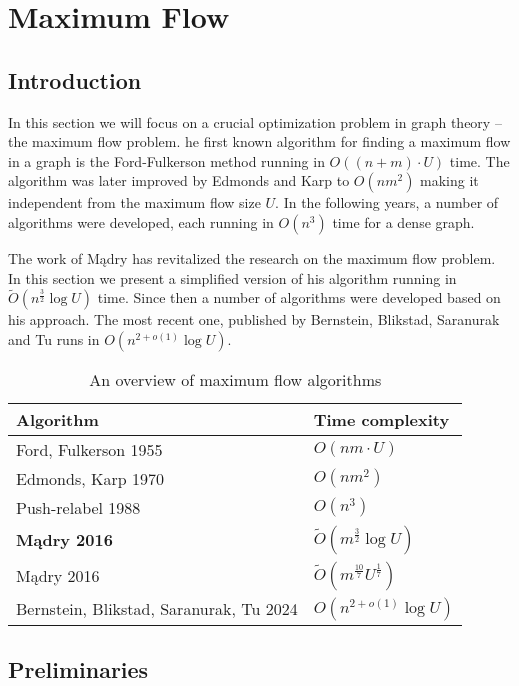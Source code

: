 \chapter{Maximum Flow}
\section{Introduction}
In this section we will focus on a crucial optimization problem in graph theory -- the maximum flow problem.
he first known algorithm for finding a maximum flow in a graph is the Ford-Fulkerson method \cite{ford-fulkerson} running in $O((n+m)\cdot U)$ time.
The algorithm was later improved by Edmonds and Karp \cite{edmonds-karp} to $O(nm^2)$ making it independent from the maximum flow size $U$.
In the following years, a number of algorithms were developed, each running in $O(n^3)$ time for a dense graph. 

The work of Mądry has revitalized the research on the maximum flow problem.
In this section we present a simplified version of his algorithm running in $\tilde O(n^\frac{3}{2}\log U)$ time. 
Since then a number of algorithms were developed based on his approach.
The most recent one, published by Bernstein, Blikstad, Saranurak and Tu \cite{new_flow_24} runs in $O(n^{2+o(1)}\log U)$.

\begin{table}[h]
\begin{center}
\begin{tabular}{ |p{8cm}||p{3cm}| }
 \hline
 Algorithm & \centering Time complexity \tabularnewline
 \hline
 Ford, Fulkerson 1955 \cite{ford-fulkerson} & \centering $O(nm\cdot U)$ \tabularnewline Edmonds, Karp 1970 \cite{edmonds-karp} & \centering $O(nm^2)$ \tabularnewline
 Push-relabel 1988 \cite{push-relabel} & \centering $O(n^3)$ \tabularnewline
 \hdashline
 \textbf{Mądry 2016 \cite{madry}} & \centering $\tilde O(m^\frac{3}{2}\log U)$ \tabularnewline
 \hdashline
 Mądry 2016 \cite{madry} & \centering $\tilde O(m^\frac{10}{7}U^\frac{1}{7})$ \tabularnewline
 Bernstein, Blikstad, Saranurak, Tu 2024 \cite{new_flow_24} &  \centering $O(n^{2+o(1)}\log U)$ \tabularnewline
 \hline
\end{tabular}
\caption{An overview of maximum flow algorithms}
\end{center}
\end{table}

\section{Preliminaries}
